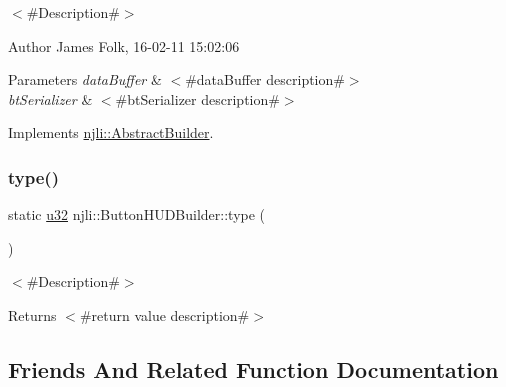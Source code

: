 $<$\#\+Description\#$>$ 

\begin{DoxyAuthor}{Author}
James Folk, 16-\/02-\/11 15\+:02\+:06
\end{DoxyAuthor}

\begin{DoxyParams}{Parameters}
{\em data\+Buffer} & $<$\#data\+Buffer description\#$>$ \\
\hline
{\em bt\+Serializer} & $<$\#bt\+Serializer description\#$>$ \\
\hline
\end{DoxyParams}


Implements \mbox{\hyperlink{classnjli_1_1_abstract_builder_ab66b774e02ccb9da554c9aab7fa6d981}{njli\+::\+Abstract\+Builder}}.

\mbox{\label{classnjli_1_1_button_h_u_d_builder_a1bbf41b90965dffb1ef55aa7772f5489}} 
\subsubsection{\texorpdfstring{type()}{type()}}
{\footnotesize\ttfamily static \mbox{\hyperlink{_util_8h_a10e94b422ef0c20dcdec20d31a1f5049}{u32}} njli\+::\+Button\+H\+U\+D\+Builder\+::type (\begin{DoxyParamCaption}{ }\end{DoxyParamCaption})\hspace{0.3cm}{\ttfamily [static]}}

$<$\#\+Description\#$>$

\begin{DoxyReturn}{Returns}
$<$\#return value description\#$>$ 
\end{DoxyReturn}


\subsection{Friends And Related Function Documentation}
\mbox{\label{classnjli_1_1_button_h_u_d_builder_acb96ebb09abe8f2a37a915a842babfac}} 
